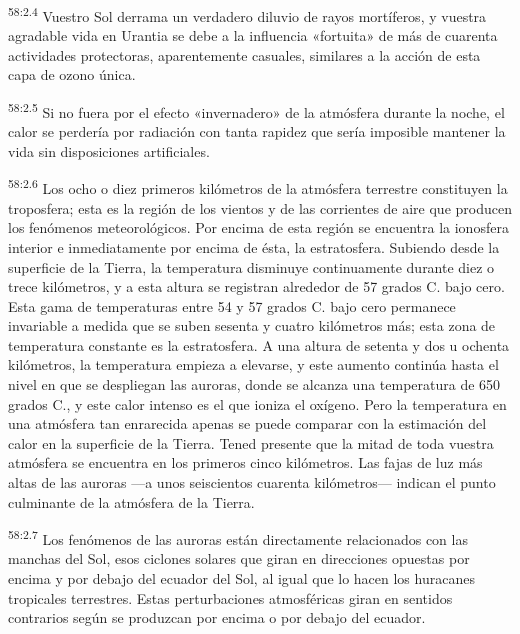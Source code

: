 \par
\textsuperscript{58:2.4} Vuestro Sol derrama un verdadero diluvio de rayos mortíferos, y vuestra agradable vida en Urantia se debe a la influencia «fortuita» de más de cuarenta actividades protectoras, aparentemente casuales, similares a la acción de esta capa de ozono única.

\par
\textsuperscript{58:2.5} Si no fuera por el efecto «invernadero» de la atmósfera durante la noche, el calor se perdería por radiación con tanta rapidez que sería imposible mantener la vida sin disposiciones artificiales.

\par
\textsuperscript{58:2.6} Los ocho o diez primeros kilómetros de la atmósfera terrestre constituyen la troposfera; esta es la región de los vientos y de las corrientes de aire que producen los fenómenos meteorológicos. Por encima de esta región se encuentra la ionosfera interior e inmediatamente por encima de ésta, la estratosfera. Subiendo desde la superficie de la Tierra, la temperatura disminuye continuamente durante diez o trece kilómetros, y a esta altura se registran alrededor de 57 grados C. bajo cero. Esta gama de temperaturas entre
54 y 57 grados C. bajo cero permanece invariable a medida que se suben sesenta y cuatro kilómetros más; esta zona de temperatura constante es la estratosfera. A una altura de setenta y dos u ochenta kilómetros, la temperatura empieza a elevarse, y este aumento continúa hasta el nivel en que se despliegan las auroras, donde se alcanza una temperatura de 650 grados C., y este calor intenso es el que ioniza el oxígeno. Pero la temperatura en una atmósfera tan enrarecida apenas se puede comparar con la estimación del calor en la superficie de la Tierra. Tened presente que la mitad de toda vuestra atmósfera se encuentra en los primeros cinco kilómetros. Las fajas de luz más altas de las auroras ---a unos seiscientos cuarenta kilómetros--- indican el punto culminante de la atmósfera de la Tierra.

\par
\textsuperscript{58:2.7} Los fenómenos de las auroras están directamente relacionados con las manchas del Sol, esos ciclones solares que giran en direcciones opuestas por encima y por debajo del ecuador del Sol, al igual que lo hacen los huracanes tropicales terrestres. Estas perturbaciones atmosféricas giran en sentidos contrarios según se produzcan por encima o por debajo del ecuador.

